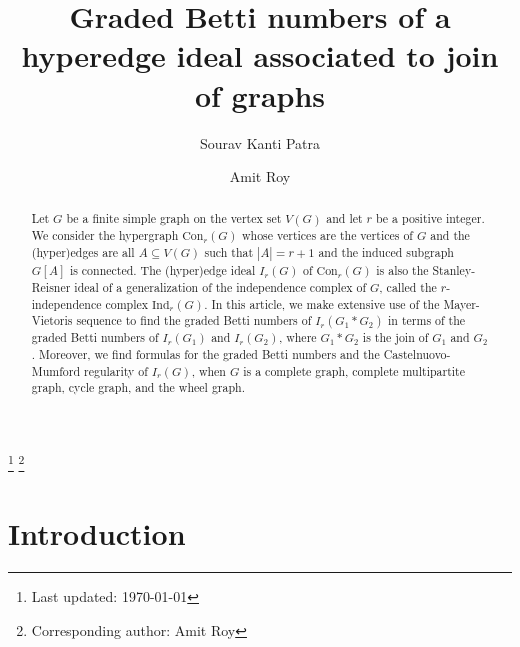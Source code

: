 \documentclass[12pt,reqno]{amsart}
\theoremstyle{definition}
\def\C{\mathrm{Con}_r(G)}
\begin{document}

\title[Hyperedge ideal of join of graphs]{Graded Betti numbers of a hyperedge ideal associated to join of graphs}
\thanks{Last updated: \today}
\thanks{Corresponding author: Amit Roy}

\author{Sourav Kanti Patra}
\address{Department of Mathematics, Kishori Sinha Mahila College (Constituent unit of Magadh University, Bodh Gaya), Aurangabad, Bihar-824101.}

\author{Amit Roy}
\address{Chennai Mathematical Institute, H1 Sipcot IT Park, Siruseri, Kelambakkam, Chennai 603103, India}


\begin{abstract}
Let $G$ be a finite simple graph on the vertex set $V(G)$ and let $r$ be a positive integer. We consider the hypergraph $\mathrm{Con}_r(G)$ whose vertices are the vertices of $G$ and the (hyper)edges are all $A\subseteq V(G)$ such that $|A|=r+1$ and the induced subgraph $G[A]$ is connected. The (hyper)edge ideal $I_r(G)$ of $\C$ is also the Stanley-Reisner ideal of a generalization of the independence complex of $G$, called the $r$-independence complex $\mathrm{Ind}_r(G)$. In this article, we make extensive use of the Mayer-Vietoris sequence to find the graded Betti numbers of $I_r(G_1*G_2)$ in terms of the graded Betti numbers of $I_r(G_1)$ and $I_r(G_2)$, where $G_1*G_2$ is the join of $G_1$ and $G_2$. Moreover, we find formulas for the graded Betti numbers and the Castelnuovo-Mumford regularity of $I_r(G)$, when $G$ is a complete graph, complete multipartite graph, cycle graph, and the wheel graph.
\end{abstract}

\maketitle


\section{Introduction}
\end{document}
